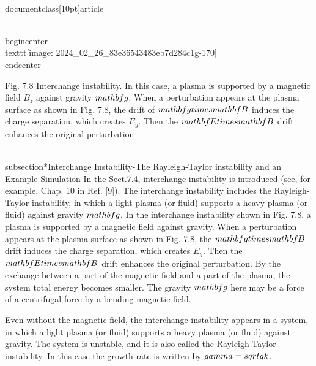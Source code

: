 \\documentclass[10pt]{article}
\begin{document}
{{{{\\begin{center}
\\texttt{[image: 2024\_02\_26\_83e36543483eb7d284c1g-170]}
\\end{center}

Fig. 7.8 Interchange instability. In this case, a plasma is supported by a magnetic field $B_{z}$ against gravity $\\mathbf{g}$. When a perturbation appears at the plasma surface as shown in Fig. 7.8, the drift of $\\mathbf{g} \\times \\mathbf{B}$ induces the charge separation, which creates $E_{y}$. Then the $\\mathbf{E} \\times \\mathbf{B}$ drift enhances the original perturbation

\\subsection*{Interchange Instability-The Rayleigh-Taylor instability and an Example Simulation}
In the Sect.7.4, interchange instability is introduced (see, for example, Chap. 10 in Ref. [9]). The interchange instability includes the Rayleigh-Taylor instability, in which a light plasma (or fluid) supports a heavy plasma (or fluid) against gravity $\\mathbf{g}$. In the interchange instability shown in Fig. 7.8, a plasma is supported by a magnetic field against gravity. When a perturbation appears at the plasma surface as shown in Fig. 7.8, the $\\mathbf{g} \\times \\mathbf{B}$ drift induces the charge separation, which creates $E_{y}$. Then the $\\mathbf{E} \\times \\mathbf{B}$ drift enhances the original perturbation. By the exchange between a part of the magnetic field and a part of the plasma, the system total energy becomes smaller. The gravity $\\mathbf{g}$ here may be a force of a centrifugal force by a bending magnetic field.

Even without the magnetic field, the interchange instability appears in a system, in which a light plasma (or fluid) supports a heavy plasma (or fluid) against gravity. The system is unstable, and it is also called the Rayleigh-Taylor instability. In this case the growth rate is written by $\\gamma=\\sqrt{g k}$.

}}}}
\end{document}

